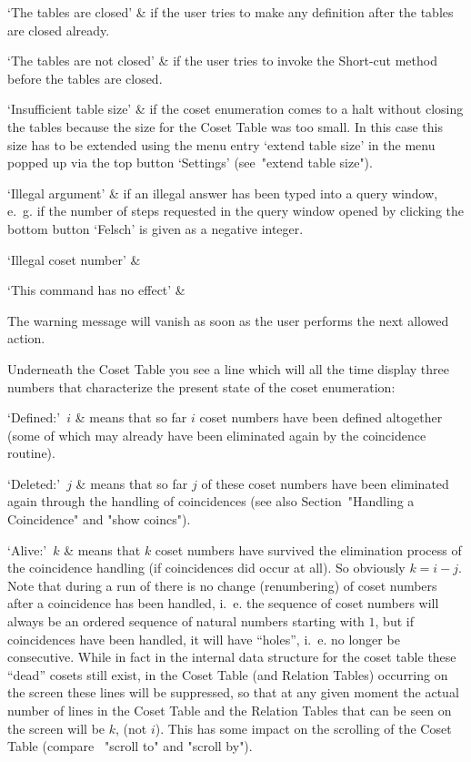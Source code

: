 `The tables are closed' &
  if the user tries to make any definition after the tables are closed
  already.

`The tables are not closed' &
  if the user tries to invoke the Short-cut method before the tables
  are closed.

`Insufficient table size' &
  if the coset enumeration comes to a halt without closing the tables
  because the size for the Coset Table was too small. In this case
  this size has to be extended using the menu entry `extend table
  size' in the menu popped up via the top button `Settings'
  (see~"extend table size").

`Illegal argument' &
  if an illegal answer has been typed into a query window, e.~g. if the
  number of steps requested in the query window opened by clicking the
  bottom button `Felsch' is given as a negative integer.

`Illegal coset number' &

`This command has no effect' &

\enditems

The warning message will vanish as soon as the user performs the next
allowed action.



Underneath the Coset Table you see a line which will all the time
display three numbers that characterize the present state of the coset
enumeration:

\beginitems

`Defined:'~$i$ &
  means that so far $i$ coset numbers have been defined altogether
  (some of which may already have been eliminated again by the
  coincidence routine).

`Deleted:'~$j$ &
  means that so far $j$ of these coset numbers have been eliminated
  again through the handling of coincidences (see also
  Section~"Handling a Coincidence" and "show coincs").

`Alive:'~$k$ &
  means that $k$ coset numbers have survived the elimination process
  of the coincidence handling (if coincidences did occur at all). So
  obviously $k = i - j$. Note that during a run of {\ITC} there is no
  change (renumbering) of coset numbers after a coincidence has been
  handled, i.~e. the sequence of coset numbers will always be an
  ordered sequence of natural numbers starting with $1$, but if
  coincidences have been handled, it will have ``holes'', i.~e. no longer
  be consecutive. While in fact in the internal data structure for the
  coset table these ``dead'' cosets still exist, in the Coset Table (and
  Relation Tables) occurring on the screen these lines will be
  suppressed, so that at any given moment the actual number of lines
  in the Coset Table and the Relation Tables that can be seen on the
  screen will be $k$, (not $i$). This has some impact on the scrolling
  of the Coset Table (compare ~"scroll to" and "scroll by").

